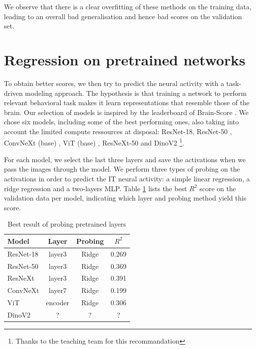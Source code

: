 \documentclass[10pt,conference,compsocconf]{IEEEtran}
\begin{document}
We observe that there is a clear overfitting of these methods on the training data, leading to an overall bad generalisation and hence bad scores on the validation set.

\section{Regression on pretrained networks}
To obtain better scores, we then try to predict the neural activity with a task-driven modeling approach. The hypothesis is that training a network to perform relevant behavioral task makes it learn representations that resemble those of the brain. Our selection of models is inspired by the leaderboard of Brain-Score \cite{SchrimpfKubilius2018BrainScore, Schrimpf2020integrative}. We chose six models, including some of the best performing ones, also taking into account the limited compute ressources at disposal: ResNet-18, ResNet-50 \cite{ResNet}, ConvNeXt (base) \cite{ConvNeXt}, ViT (base) \cite{ViT}, ResNeXt-50 \cite{ResNeXt} and DinoV2 \cite{DinoV2}\footnote{Thanks to the teaching team for this recommandation}.

For each model, we select the last three layers and save the activations when we pass the images through the model. We perform three types of probing on the activations in order to predict the IT neural activity: a simple linear regression, a ridge regression and a two-layers MLP. Table \ref{table:pretrained} lists the best \(R^2\) score on the validation data per model, indicating which layer and probing method yield this score.

\begin{table}[h!]
    \centering
    \begin{tabular}{|l|c|c|c|}
        \hline
        Model & Layer & Probing & \(R^2\) \\
        \hline
        ResNet-18 & layer3 & Ridge & 0.269 \\
        ResNet-50 & layer3 & Ridge & 0.369 \\
        ResNeXt & layer3 & Ridge & 0.391 \\
        ConvNeXt & layer7 & Ridge & 0.199 \\
        ViT & encoder & Ridge & 0.306 \\
        DinoV2 & ? & ? & ? \\
        \hline
    \end{tabular}
    \caption{Best result of probing pretrained layers}
    \label{table:pretrained}
\end{table}
\end{document}
